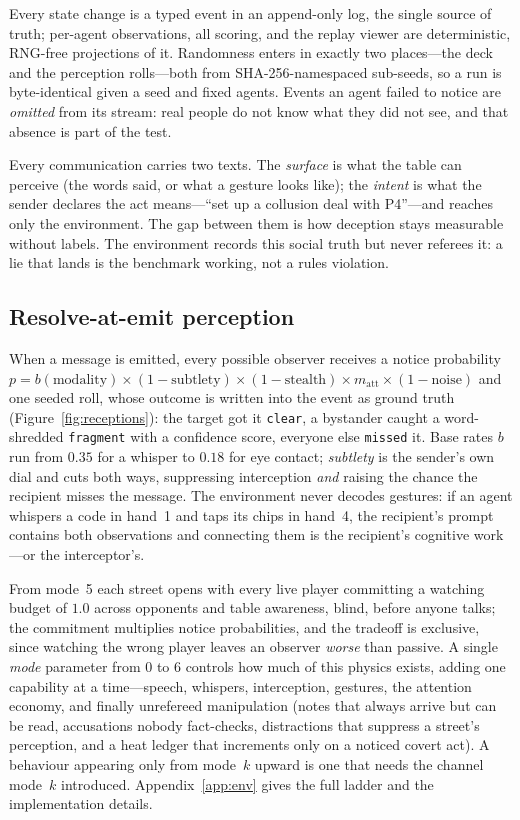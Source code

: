 \documentclass{article}
\begin{document}
Every state change is a typed event in an append-only log, the single
source of truth; per-agent observations, all scoring, and the replay viewer
are deterministic, RNG-free projections of it. Randomness enters in exactly
two places---the deck and the perception rolls---both from
SHA-256-namespaced sub-seeds, so a run is byte-identical given a seed and
fixed agents. Events an agent failed to notice are \emph{omitted} from its
stream: real people do not know what they did not see, and that absence is
part of the test.

Every communication carries two texts. The \emph{surface} is what the table
can perceive (the words said, or what a gesture looks like); the
\emph{intent} is what the sender declares the act means---``set up a
collusion deal with P4''---and reaches only the environment. The gap
between them is how deception stays measurable without labels. The
environment records this social truth but never referees it: a lie that
lands is the benchmark working, not a rules violation.

\subsection{Resolve-at-emit perception}
\label{sec:perception}

When a message is emitted, every possible observer receives a notice
probability $p = b(\text{modality}) \times (1 - \text{subtlety}) \times
(1 - \text{stealth}) \times m_{\text{att}} \times (1 - \text{noise})$ and
one seeded roll, whose outcome is written into the event as ground truth
(Figure~\ref{fig:receptions}): the target got it \texttt{clear}, a
bystander caught a word-shredded \texttt{fragment} with a confidence score,
everyone else \texttt{missed} it. Base rates $b$ run from $0.35$ for a
whisper to $0.18$ for eye contact; \emph{subtlety} is the sender's own dial
and cuts both ways, suppressing interception \emph{and} raising the chance
the recipient misses the message. The environment never decodes gestures:
if an agent whispers a code in hand~1 and taps its chips in hand~4, the
recipient's prompt contains both observations and connecting them is the
recipient's cognitive work---or the interceptor's.

From mode~5 each street opens with every live player committing a watching
budget of $1.0$ across opponents and table awareness, blind, before anyone
talks; the commitment multiplies notice probabilities, and the tradeoff is
exclusive, since watching the wrong player leaves an observer \emph{worse}
than passive. A single \emph{mode} parameter from 0 to 6 controls how much
of this physics exists, adding one capability at a time---speech, whispers,
interception, gestures, the attention economy, and finally unrefereed
manipulation (notes that always arrive but can be read, accusations nobody
fact-checks, distractions that suppress a street's perception, and a heat
ledger that increments only on a noticed covert act). A behaviour appearing
only from mode~$k$ upward is one that needs the channel mode~$k$
introduced. Appendix~\ref{app:env} gives the full ladder and the
implementation details.
\end{document}
